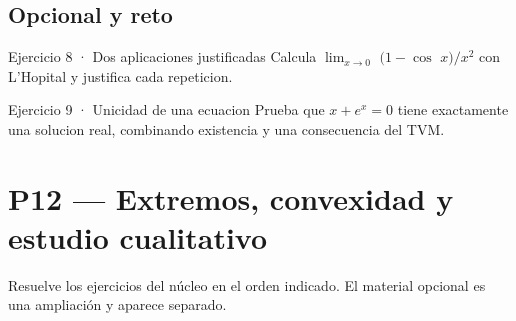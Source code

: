 \documentclass[10pt,a4paper,oneside,openany]{book}
\begin{document}
\section*{Opcional y reto}
\begin{PSevenOptionalFixed}{Ejercicio 8 · Dos aplicaciones justificadas}
Calcula \(\lim_{x\to 0}\) \((1-\cos\) \(x)/x^{2}\) con L'Hopital y justifica cada repeticion.
\end{PSevenOptionalFixed}
\begin{PSevenOptionalFixed}{Ejercicio 9 · Unicidad de una ecuacion}
Prueba que \(x+e^x=0\) tiene exactamente una solucion real, combinando existencia y una consecuencia del TVM.
\end{PSevenOptionalFixed}
\chapter{P12 — Extremos, convexidad y estudio cualitativo}
Resuelve los ejercicios del núcleo en el orden indicado. El material opcional es una ampliación y aparece separado.
\end{document}
